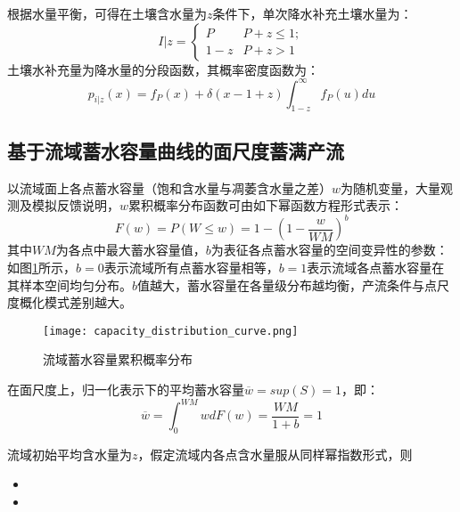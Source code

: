 根据水量平衡，可得在土壤含水量为$z$条件下，单次降水补充土壤水量为：
\begin{equation}
I|z=
 \begin{cases}
 P&{P+z\leq 1};\\1-z &{P+z>1}
 \end{cases}
\end{equation}
土壤水补充量为降水量的分段函数，其概率密度函数为：
\begin{equation}
\label{point}
p_{i|z}(x)=f_P(x)+\delta(x-1+z)\int_{1-z}^{\infty} f_P(u) du 
\end{equation}


\subsection{基于流域蓄水容量曲线的面尺度蓄满产流}
以流域面上各点蓄水容量（饱和含水量与凋萎含水量之差）$w$为随机变量，大量观测及模拟反馈说明，$w$累积概率分布函数可由如下幂函数方程形式表示\cite{zrj}：
\begin{equation}
F(w)=P(W \leq w)=1-(1-\frac{w}{WM})^b
\end{equation} 
其中$WM$为各点中最大蓄水容量值，$b$为表征各点蓄水容量的空间变异性的参数：如图\ref{ununity}所示，$b=0$表示流域所有点蓄水容量相等，$b=1$表示流域各点蓄水容量在其样本空间均匀分布。$b$值越大，蓄水容量在各量级分布越均衡，产流条件与点尺度概化模式差别越大。
\begin{figure}[H]
\centering
\texttt{[image: capacity\_distribution\_curve.png]}
\caption{流域蓄水容量累积概率分布}
\label{ununity}
\end{figure}
在面尺度上，归一化表示下的平均蓄水容量$\overline{w}=sup(S)=1$，即：
\begin{equation}
\overline{w}=\int_{0}^{WM} wdF(w)=\frac{WM}{1+b}=1
\end{equation} 

流域初始平均含水量为$z$，假定流域内各点含水量服从同样幂指数形式，则
\iffalse
\begin{itemize}
\item 
\item 
\end{itemize}

